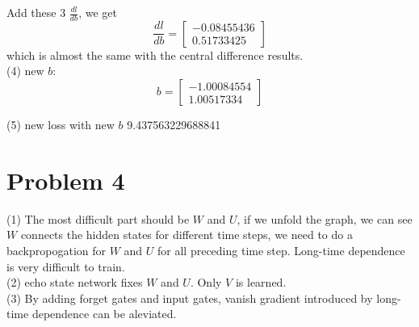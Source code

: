 \documentclass[12pt]{article}
\begin{document}
    Add these 3 $\frac{dl}{db}$, we get
\begin{equation}
    \frac{dl}{db}=\begin{bmatrix} -0.08455436 \\0.51733425\end{bmatrix}
\end{equation}
    which is almost
    the same with the central difference results.\\
(4) new $b$:
\begin{equation}
     b=\begin{bmatrix} -1.00084554 \\ 1.00517334\end{bmatrix}
\end{equation}

(5) new loss with new $b$ 9.437563229688841

\section{Problem 4}
(1) The most difficult part should be $W$ and $U$, if we unfold the graph, we
can see $W$ connects the hidden states for different time steps, we
need to do a backpropogation for $W$ and $U$ for all preceding time step.
Long\--time dependence is very difficult to train. \\
(2) echo state network fixes $W$ and $U$. Only $V$ is learned.\\
(3) By adding forget gates and input gates, vanish gradient introduced
by long\--time dependence can be aleviated.
\end{document}
